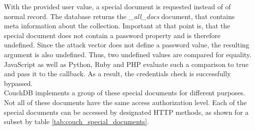 With the provided user value, a special document is requested instead of of normal record. The database returns the \emph{\_all\_docs} document, that contains meta information about the collection. Important at that point is, that the special document does not contain a password property and is therefore undefined. Since the attack vector does not define a password value, the resulting argument is also undefined. Thus, two undefined values are compared for equality. JavaScript as well as Python, Ruby and PHP evaluate such a comparison to true and pass it to the callback. As a result, the credentials check is successfully bypassed.\\

CouchDB implements a group of these special documents for different purposes. Not all of these documents have the same access authorization level. Each of the special documents can be accessed by designated HTTP methods, as shown for a subset by table \ref{tab:couch_special_documents}. \\

